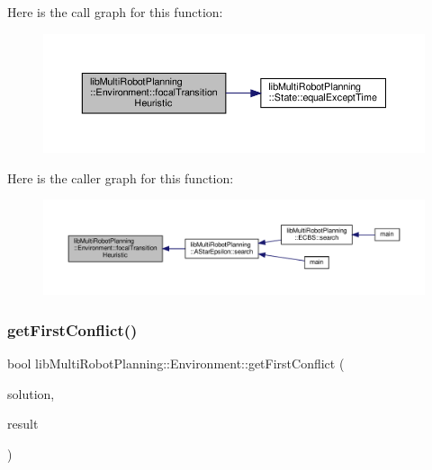 Here is the call graph for this function\+:
\nopagebreak
\begin{figure}[H]
\begin{center}
\leavevmode
\includegraphics[width=350pt]{classlib_multi_robot_planning_1_1_environment_adf9e6ca87f829fd0fdc185d85b29bb4e_cgraph}
\end{center}
\end{figure}
Here is the caller graph for this function\+:
\nopagebreak
\begin{figure}[H]
\begin{center}
\leavevmode
\includegraphics[width=350pt]{classlib_multi_robot_planning_1_1_environment_adf9e6ca87f829fd0fdc185d85b29bb4e_icgraph}
\end{center}
\end{figure}
\mbox{\label{classlib_multi_robot_planning_1_1_environment_a1d47448bd35c1f46f70c6b7fa37e8146}} 
\subsubsection{\texorpdfstring{get\+First\+Conflict()}{getFirstConflict()}}
{\footnotesize\ttfamily bool lib\+Multi\+Robot\+Planning\+::\+Environment\+::get\+First\+Conflict (\begin{DoxyParamCaption}\item[{const std\+::vector$<$ \hyperlink{structlib_multi_robot_planning_1_1_plan_result}{Plan\+Result}$<$ \hyperlink{structlib_multi_robot_planning_1_1_state}{State}, \hyperlink{namespacelib_multi_robot_planning_aba73fb71693f86a324adfa0e41e1053d}{Action}, int $>$ $>$ \&}]{solution,  }\item[{\hyperlink{structlib_multi_robot_planning_1_1_conflict}{Conflict} \&}]{result }\end{DoxyParamCaption})\hspace{0.3cm}{\ttfamily [inline]}}



